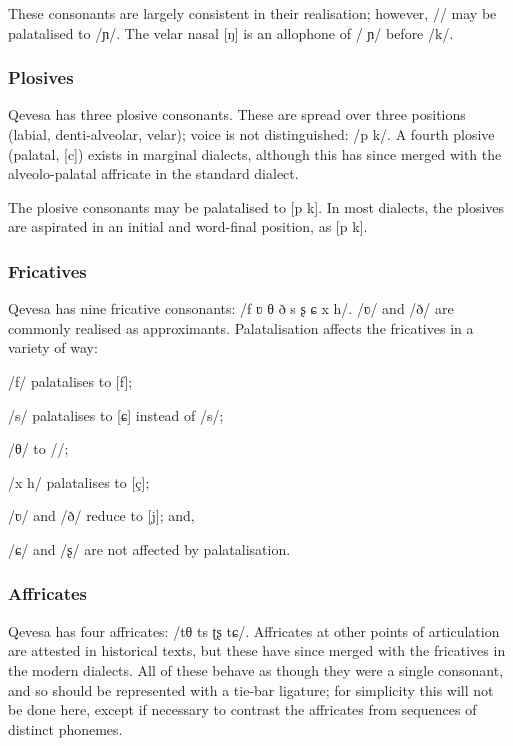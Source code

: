 \documentclass[grammar]{subfiles}
\begin{document}
  These consonants are largely consistent in their realisation; however, // may be palatalised to /ɲ/. The velar nasal [ŋ] is an allophone of / ɲ/ before /k/.

  \subsubsection{Plosives}
  \label{sssec:plosives}

  Qevesa has three plosive consonants. These are spread over three positions (labial, denti-alveolar, velar); voice is not distinguished: /p  k/. A fourth plosive (palatal, [c]) exists in marginal dialects, although this has since merged with the alveolo-palatal affricate in the standard dialect.

  The plosive consonants may be palatalised to [p\superj{}  k\superj]. In most dialects, the plosives are aspirated in an initial and word-final position, as [p\superh{}  k\superh].

  \subsubsection{Fricatives}
  \label{sssec:fricatives}

  Qevesa has nine fricative consonants: /f ʋ θ ð s ʂ ɕ x h/. /ʋ/ and /ð/ are commonly realised as approximants. Palatalisation affects the fricatives in a variety of way: 

  \begin{itemize*}
    \item /f/ palatalises to [f\superj{}];
    \item /s/ palatalises to [ɕ] instead of /s\superj/;
    \item /θ/ to //;
    \item /x h/ palatalises to [ç];
    \item /ʋ/ and /ð/ reduce to [j]; and,
    \item /ɕ/ and /ʂ/ are not affected by palatalisation.
  \end{itemize*}

  \subsubsection{Affricates}
  \label{sssec:affricates}

  Qevesa has four affricates: /tθ ts ʈʂ tɕ/. Affricates at other points of articulation are attested in historical texts, but these have since merged with the fricatives in the modern dialects. All of these behave as though they were a single consonant, and so should be represented with a tie-bar ligature; for simplicity this will not be done here, except if necessary to contrast the affricates from sequences of distinct phonemes. 
\end{document}
